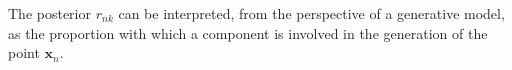 \documentclass[../../../main.tex]{subfiles}
\begin{document}
The posterior $r_{nk}$ can be interpreted, from the perspective of a generative model, as the proportion with which a component is involved in the generation of the point $\bm{x}_n$.







\end{document}

